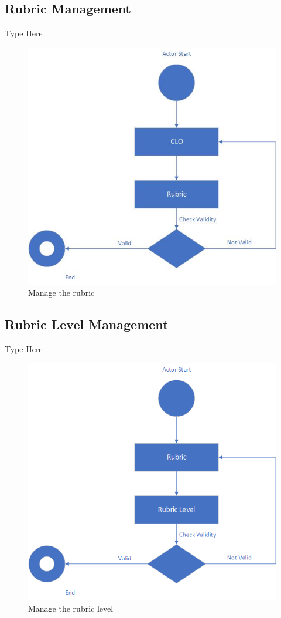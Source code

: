 \documentclass[12pt,a4paper]{article}
\begin{document}
\subsection{Rubric Management}
Type Here
\begin{figure}[H]
  \centering
    \includegraphics[scale=1]{Rubric}
    
  \caption{Manage the rubric}
\end{figure}
\subsection{Rubric Level Management}
Type Here
\begin{figure}[H]
  \centering
    \includegraphics[scale=1]{Rubric Level}
    
  \caption{Manage the rubric level}
\end{figure}
\end{document}

